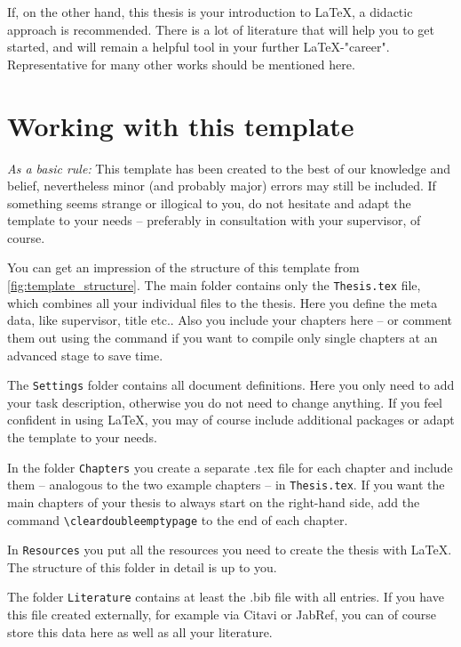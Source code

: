 If, on the other hand, this thesis is your introduction to \LaTeX{}, a didactic approach is recommended.
There is a lot of literature that will help you to get started, and will remain a helpful tool in your further
\LaTeX-"career". Representative for many other works \autocite{Schlosser2014} should be mentioned here.


\section{Working with this template}

\emph{As a basic rule:} This template has been created to the best of our knowledge and belief, nevertheless minor (and probably major) errors may still be included. If something seems strange or illogical to you, do not hesitate and adapt the template to your needs -- preferably in consultation with your supervisor, of course.

You can get an impression of the structure of this template from \cref{fig:template_structure}. The main folder contains only the \texttt{Thesis.tex} file, which combines all your individual files to the thesis. Here you define the meta data, like supervisor, title etc.. Also you include your chapters here -- or comment them out using the \verb|| command if you want to compile only single chapters at an advanced stage to save time.

The \texttt{Settings} folder contains all document definitions. Here you only need to add your task description, otherwise you do not need to change anything. If you feel confident in using \LaTeX{}, you may of course include additional packages or adapt the template to your needs.

In the folder \texttt{Chapters} you create a separate .tex file for each chapter and include them -- analogous to the two example chapters -- in \texttt{Thesis.tex}. If you want the main chapters of your thesis to always start on the right-hand side, add the command \verb*|\cleardoubleemptypage| to the end of each chapter.

In \texttt{Resources} you put all the resources you need to create the thesis with \LaTeX{}. The structure of this folder in detail is up to you.

The folder \texttt{Literature} contains at least the .bib file with all entries. If you have this file created externally, for example via Citavi or JabRef, you can of course store this data here as well as all your literature.

